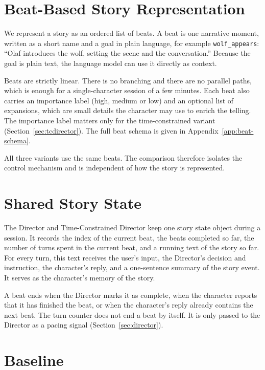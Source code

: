 \section{Beat-Based Story Representation}\label{sec:beats}

We represent a story as an ordered list of beats. A beat is one narrative moment, written as a short name and a goal in plain language, for example \texttt{wolf\_appears}: ``Olaf introduces the wolf, setting the scene and the conversation.'' Because the goal is plain text, the language model can use it directly as context.

Beats are strictly linear. There is no branching and there are no parallel paths, which is enough for a single-character session of a few minutes. Each beat also carries an importance label (high, medium or low) and an optional list of expansions, which are small details the character may use to enrich the telling. The importance label matters only for the time-constrained variant (Section~\ref{sec:tcdirector}). The full beat schema is given in Appendix~\ref{app:beat-schema}.

All three variants use the same beats. The comparison therefore isolates the control mechanism and is independent of how the story is represented.

\section{Shared Story State}\label{sec:state}

The Director and Time-Constrained Director keep one story state object during a session. It records the index of the current beat, the beats completed so far, the number of turns spent in the current beat, and a running text of the story so far. For every turn, this text receives the user's input, the Director's decision and instruction, the character's reply, and a one-sentence summary of the story event. It serves as the character's memory of the story.

A beat ends when the Director marks it as complete, when the character reports that it has finished the beat, or when the character's reply already contains the next beat. The turn counter does not end a beat by itself. It is only passed to the Director as a pacing signal (Section~\ref{sec:director}).

\section{Baseline}\label{sec:baseline}

